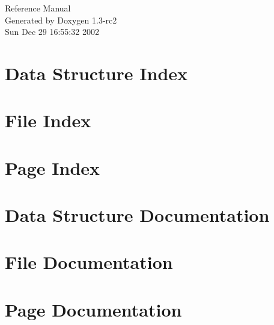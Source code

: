 \documentclass[a4paper]{book}
\begin{document}
\begin{titlepage}
\vspace*{7cm}
\begin{center}
{\Large Reference Manual}\\
\vspace*{1cm}
{\large Generated by Doxygen 1.3-rc2}\\
\vspace*{0.5cm}
{\small Sun Dec 29 16:55:32 2002}\\
\end{center}
\end{titlepage}
\clearemptydoublepage
{}
\tableofcontents
\clearemptydoublepage
{}
\chapter{Data Structure Index}

\chapter{File Index}

\chapter{Page Index}

\chapter{Data Structure Documentation}



\chapter{File Documentation}




\chapter{Page Documentation}

\printindex
\end{document}
